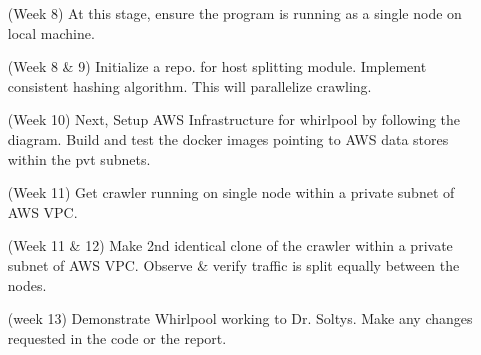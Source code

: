 \begin{itemize}
\begin{itemize}
  \end{itemize}
\item[(Week 8)] At this stage, ensure the program is running as a single node on local machine.
\item[(Week 8 \& 9)] Initialize a repo. for host splitting module. Implement consistent hashing algorithm.
  This will parallelize crawling.
\item[(Week 10)] Next, Setup AWS Infrastructure for whirlpool by following the diagram. Build and test
    the docker images pointing to AWS data stores within the pvt subnets.
\item[(Week 11)] Get crawler running on single node within a private subnet of AWS VPC.
\item[(Week 11 \& 12)] Make 2nd identical clone of the crawler within a private subnet of AWS VPC. Observe \& verify traffic is split equally between the nodes.
\item[(week 13)] Demonstrate Whirlpool working to Dr. Soltys. Make any changes requested in the code or the report.
\end{itemize}
